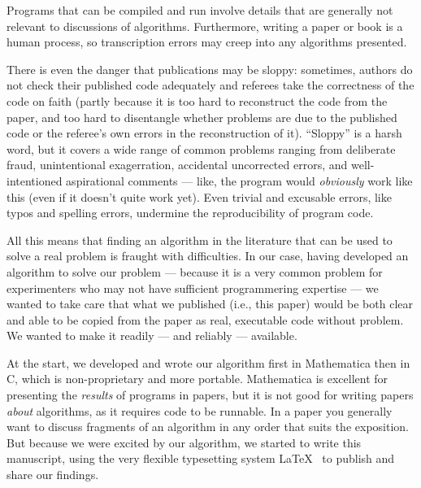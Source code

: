 \documentclass[prodmode,acmtecs]{acmsmall} %
\begin{document}
Programs that can be compiled and run involve details that are generally not relevant to discussions of algorithms. Furthermore, writing a paper or book is a human process, so transcription errors may creep into any algorithms presented. 

There is even the danger that publications may be sloppy: sometimes, authors do not check their published code adequately and referees take the correctness of the code on faith (partly because it is too hard to reconstruct the code from the paper, and too hard to disentangle whether problems are due to the published code or the referee's own errors in the reconstruction of it). ``Sloppy'' is a harsh word, but it covers a wide range of common problems ranging from deliberate fraud, unintentional exagerration, accidental uncorrected errors, and well-intentioned aspirational comments --- like, the program would \emph{obviously\/} work like this (even if it doesn't quite work yet). Even trivial and excusable errors, like typos and spelling errors, undermine the reproducibility of program code.

All this means that finding an algorithm in the literature that can be used to solve a real problem is fraught with difficulties. In our case, having developed an algorithm to solve our problem --- because it is a very common problem for experimenters who may not have sufficient programmering expertise --- we wanted to take care that what we published (i.e., this paper) would be both clear and able to be copied from the paper as real, executable code without problem. We wanted to make it readily --- and reliably --- available.

At the start, we developed and wrote our algorithm first in Mathematica then in C, which is non-proprietary and more portable. Mathematica is excellent for presenting the \emph{results\/} of programs in papers, but it is not good for writing papers \emph{about\/} algorithms, as it requires code to be runnable. In a paper you generally want to discuss fragments of an algorithm in any order that suits the exposition. But because we were excited by our algorithm, we started to write this manuscript, using the very flexible typesetting system \LaTeX\ \cite{latex} to publish and share our findings.
\end{document}
